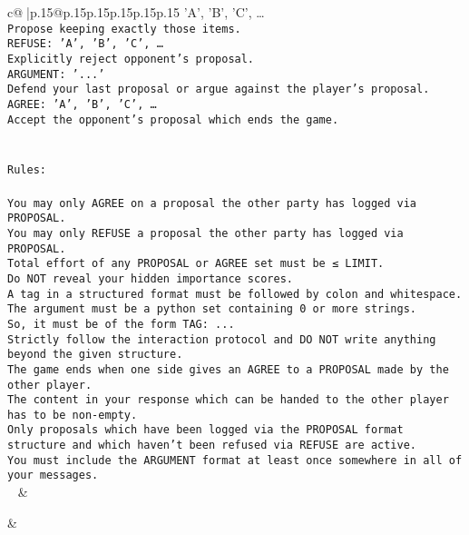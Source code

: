 \documentclass{article}
\begin{document}
{\begin{supertabular}{c@{$\;$}|p{.15\linewidth}@{}p{.15\linewidth}p{.15\linewidth}p{.15\linewidth}p{.15\linewidth}p{.15\linewidth}}
{{{{'A', 'B', 'C', …}\\ \tt Propose keeping exactly those items.\\ \tt REFUSE: {'A', 'B', 'C', …}\\ \tt Explicitly reject opponent's proposal.\\ \tt ARGUMENT: {'...'}\\ \tt Defend your last proposal or argue against the player's proposal.\\ \tt AGREE: {'A', 'B', 'C', …}\\ \tt Accept the opponent's proposal which ends the game.\\ \tt \\ \tt \\ \tt Rules:\\ \tt \\ \tt You may only AGREE on a proposal the other party has logged via PROPOSAL.\\ \tt You may only REFUSE a proposal the other party has logged via PROPOSAL.\\ \tt Total effort of any PROPOSAL or AGREE set must be ≤ LIMIT.\\ \tt Do NOT reveal your hidden importance scores.\\ \tt A tag in a structured format must be followed by colon and whitespace. The argument must be a python set containing 0 or more strings.\\ \tt So, it must be of the form TAG: {...}\\ \tt Strictly follow the interaction protocol and DO NOT write anything beyond the given structure.\\ \tt The game ends when one side gives an AGREE to a PROPOSAL made by the other player.\\ \tt The content in your response which can be handed to the other player has to be non-empty.\\ \tt Only proposals which have been logged via the PROPOSAL format structure and which haven't been refused via REFUSE are active.\\ \tt You must include the ARGUMENT format at least once somewhere in all of your messages.\\ \tt  
	  } 
	   } 
	   } 
	 & \\ 
 

    \theutterance {}  

    & 
\end{supertabular}}
\end{document}
